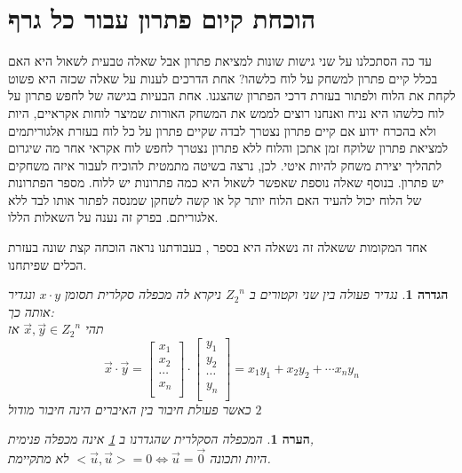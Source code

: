 \documentclass[12pt,twoside]{article}
\newtheorem{definition}{הגדרה}[section]
\newtheorem{comm}{הערה}[section]
\newcommand{\Zn}{{Z_2}^n}
\begin{document}
\section{הוכחת  קיום פתרון עבור כל גרף}
עד כה הסתכלנו על שני גישות שונות למציאת פתרון
אבל שאלה טבעית לשאול היא האם בכלל קיים פתרון למשחק על לוח כלשהו?
אחת הדרכים לענות על שאלה שכזה היא פשוט לקחת את הלוח ולפתור בעזרת 
דרכי הפתרון שהצגנו.
אחת הבעיות בגישה של לחפש פתרון על לוח כלשהו היא 
נניח ואנחנו רוצים לממש את המשחק האורות שמיצר לוחות אקראיים, היות ולא בהכרח ידוע אם קיים פתרון 
נצטרך לבדה שקיים פתרון על כל לוח בעזרת אלגוריתמים למציאת פתרון שלוקח זמן 
אתכן והלוח ללא פתרון נצטרך לחפש לוח אקראי אחר
מה שיגרום לתהליך יצירת משחק להיות איטי.
לכן, נרצה בשיטה מתמטית להוכיח לעבור איזה משחקים יש פתרון.
בנוסף שאלה נוספת שאפשר לשאול היא כמה פתרונות יש ללוח.
מספר הפתרונות של הלוח יכול להעיד האם הלוח יותר קל או קשה לשחקן שמנסה לפתור אותו
לבד ללא אלגוריתם.
בפרק זה נענה על השאלות הללו.

אחד המקומות ששאלה זה נשאלה היא בספר 
\cite{B3},
בעבודתנו נראה הוכחה קצת שונה בעזרת הכלים שפיתחנו.

\begin{definition}
    \label{def:inner_mul}
    נגדיר פעולה 
    בין שני וקטורים ב
    $\Zn$
    ניקרא לה מכפלה סקלרית
    תסומן 
    $x \cdot y$
    ונגדיר אותה כך:
    \\
    תהי 
    $\vec{x}, \vec{y} \in \Zn$
    אז 
    \[
        \vec{x} \cdot \vec{y} = 
        \begin{bmatrix}
            x_1 \\
            x_2 \\
            \cdots \\
            x_n \\
        \end{bmatrix}
        \cdot 
        \begin{bmatrix}
            y_1 \\
            y_2 \\
            \cdots \\
            y_n \\
        \end{bmatrix}
        = 
        x_1 y_1 + x_2 y_2 + \cdots x_n y_n
    \]
    כאשר 
    פעולת חיבור בין האיברים 
    הינה 
    חיבור מודול
    $2$
\end{definition}

\begin{comm}
    \label{comm:not_really_inner_mul}
    המכפלה הסקלרית שהגדרנו ב
    \ref{def:inner_mul}
    אינה מכפלה פנימית,
    \\
    היות ותכונה 
    $<\vec{u},\vec{u}> = 0 \Leftrightarrow \vec{u} = \vec{0} $
    לא מתקיימת.
\end{comm}
\end{document}
